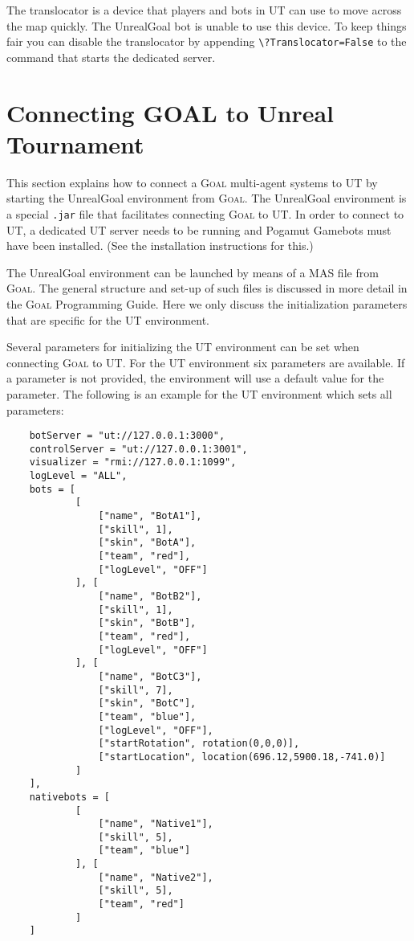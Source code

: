 \documentclass[11pt,a4paper]{article}
\newcommand{\Goal}{\textsc{Goal}}
\begin{document}
The translocator is a device that players and bots in UT can use to move across the map quickly. The UnrealGoal bot is unable to use this device. To keep things fair you can disable the translocator by appending \verb|\?Translocator=False| to the command that starts the dedicated server.

%
%
%
\section{Connecting GOAL to Unreal Tournament}\label{sec:masspec}
%

This section explains how to connect a {\Goal} multi-agent systems to UT by starting the UnrealGoal environment from {\Goal}. The UnrealGoal environment is a special \texttt{.jar} file that facilitates connecting {\Goal} to UT. In order to connect to UT, a dedicated UT server needs to be running and Pogamut Gamebots must have been installed. (See the installation instructions for this.) %

The UnrealGoal environment can be launched by means of a MAS file from {\Goal}. The general structure and set-up of such files is discussed in more detail in the {\Goal} Programming Guide. Here we only discuss the initialization parameters that are specific for the UT environment.

Several parameters for initializing the UT environment can be set when connecting {\Goal} to UT. For the UT environment six parameters are available. If a parameter is not provided, the environment will use a default value for the parameter. The following is an example for the UT environment which sets all parameters:

\begin{verbatim}
    botServer = "ut://127.0.0.1:3000",
    controlServer = "ut://127.0.0.1:3001",
    visualizer = "rmi://127.0.0.1:1099",
    logLevel = "ALL", 
    bots = [
            [
                ["name", "BotA1"],
                ["skill", 1],
                ["skin", "BotA"], 
                ["team", "red"],
                ["logLevel", "OFF"]
            ], [
                ["name", "BotB2"],
                ["skill", 1],
                ["skin", "BotB"], 
                ["team", "red"],
                ["logLevel", "OFF"]
            ], [
                ["name", "BotC3"],
                ["skill", 7],
                ["skin", "BotC"], 
                ["team", "blue"],
                ["logLevel", "OFF"],
                ["startRotation", rotation(0,0,0)],
                ["startLocation", location(696.12,5900.18,-741.0)]
            ]
    ],
    nativebots = [
            [
                ["name", "Native1"],
                ["skill", 5],
                ["team", "blue"]	
            ], [
                ["name", "Native2"],
                ["skill", 5],
                ["team", "red"]	
            ]    
    ]
\end{verbatim}
\end{document}
